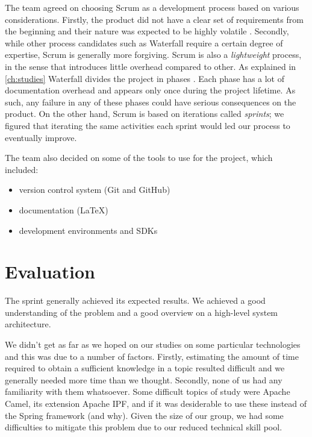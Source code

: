 The team agreed on choosing Scrum as a development process based on various considerations.
Firstly, the product did not have a clear set of requirements from the beginning and their nature was expected
to be highly volatile \cite{Sommerville9}. %
Secondly, while other process candidates such as Waterfall require a certain degree of expertise,
Scrum is generally more forgiving. Scrum is also a \textit{lightweight} process, in the sense that introduces
little overhead compared to other.
As explained in \ref{ch:studies} Waterfall divides the project in phases \cite{Sommerville9}.
Each phase has a lot of documentation overhead and appears only once during the project lifetime.
As such, any failure in any of these phases could have serious consequences on the product.
On the other hand, Scrum is based on iterations called \textit{sprints}; we figured that iterating the
same activities each sprint would led our process to eventually improve.

The team also decided on some of the tools to use for the project, which included:
\begin{itemize}
\item version control system (Git and GitHub)
\item documentation (LaTeX)
\item development environments and SDKs
\end{itemize}

\section{Evaluation}

The sprint generally achieved its expected results.
We achieved a good understanding of the problem and a good overview
on a high-level system architecture.

We didn't get as far as we hoped on our studies on some particular technologies
and this was due to a number of factors.
Firstly, estimating the amount of time required to obtain a sufficient knowledge
in a topic resulted difficult and we generally needed more time than we thought.
Secondly, none of us had any familiarity with them whatsoever.
Some difficult topics of study were Apache Camel, its extension Apache IPF,
and if it was desiderable to use these instead of the Spring framework (and why).
Given the size of our group, we had some difficulties to mitigate this problem due to
our reduced technical skill pool.

